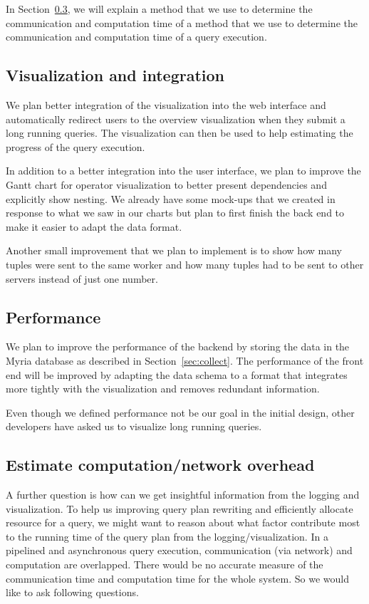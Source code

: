 \documentclass[11pt]{scrartcl}
\begin{document}
In Section~\ref{sec:overhead}, we will explain a method that we use to determine the communication and computation time of a method that we use to determine the communication and computation time of a query execution.


\subsection{Visualization and integration}
\label{sec:vizimprovement}

We plan better integration of the visualization into the web interface and automatically redirect users to the overview visualization when they submit a long running queries. The visualization can then be used to help estimating the progress of the query execution.

In addition to a better integration into the user interface, we plan to improve the Gantt chart for operator visualization to better present dependencies and explicitly show nesting. We already have some mock-ups that we created in response to what we saw in our charts but plan to first finish the back end to make it easier to adapt the data format.

Another small improvement that we plan to implement is to show how many tuples were sent to the same worker and how many tuples had to be sent to other servers instead of just one number.


\subsection{Performance}
\label{sec:performance}

We plan to improve the performance of the backend by storing the data in the Myria database as described in Section~\ref{sec:collect}. The performance of the front end will be improved by adapting the data schema to a format that integrates more tightly with the visualization and removes redundant information.

Even though we defined performance not be our goal in the initial design, other developers have asked us to visualize long running queries.


\subsection{Estimate computation/network overhead}
\label{sec:overhead}

A further question is  how can we get insightful information from the logging and visualization. To help us improving query plan rewriting and efficiently allocate resource for a query, we might want to reason about what factor contribute most to the running time of the query plan from the logging/visualization. In a pipelined and asynchronous query execution, communication (via network) and computation are overlapped. There would be no accurate measure of the communication time and computation time for the whole system.  So we would like to ask following questions.
\end{document}
